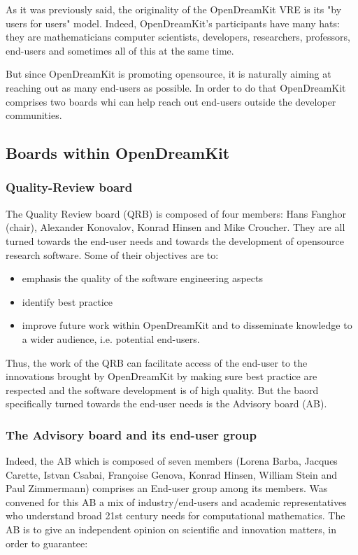 \documentclass{deliverablereport}
\begin{document}
As it was previously said, the originality of the OpenDreamKit VRE is its "by users for users" model. Indeed, OpenDreamKit's participants have many hats: they are mathematicians computer scientists, developers, researchers, professors, end-users and sometimes all of this at the same time. 

But since OpenDreamKit is promoting opensource, it is naturally aiming at reaching out as many end-users as possible. In order to do that OpenDreamKit comprises two boards whi can help reach out end-users outside the developer communities.

\subsection{Boards within OpenDreamKit}

\subsubsection{Quality-Review board}

The Quality Review board (QRB) is composed of four members: Hans Fanghor (chair), Alexander Konovalov, Konrad Hinsen and Mike Croucher. They are all turned towards the end-user needs and towards the development of opensource research software.
Some of their objectives are to:

\begin{itemize}
\item{emphasis the quality of the software engineering aspects}
\item{identify best practice}
\item{improve future work within OpenDreamKit and to disseminate knowledge to a wider audience, i.e. potential end-users.}
\end{itemize}
  
Thus, the work of the QRB can facilitate access of the end-user to the innovations brought by OpenDreamKit by making sure best practice are respected and the software development is of high quality. But the baord specifically turned towards the end-user needs is the Advisory board (AB).

\subsubsection{The Advisory board and its end-user group}

Indeed, the AB which is composed of seven members (Lorena Barba, Jacques Carette, Istvan Csabai, Françoise Genova, Konrad Hinsen, William Stein and Paul Zimmermann) comprises an End-user group among its members. Was convened for this AB a mix of industry/end-users and academic representatives who understand broad 21st century needs for computational mathematics.
The AB is to give an independent opinion on scientific and innovation matters, in order to guarantee:
\end{document}
